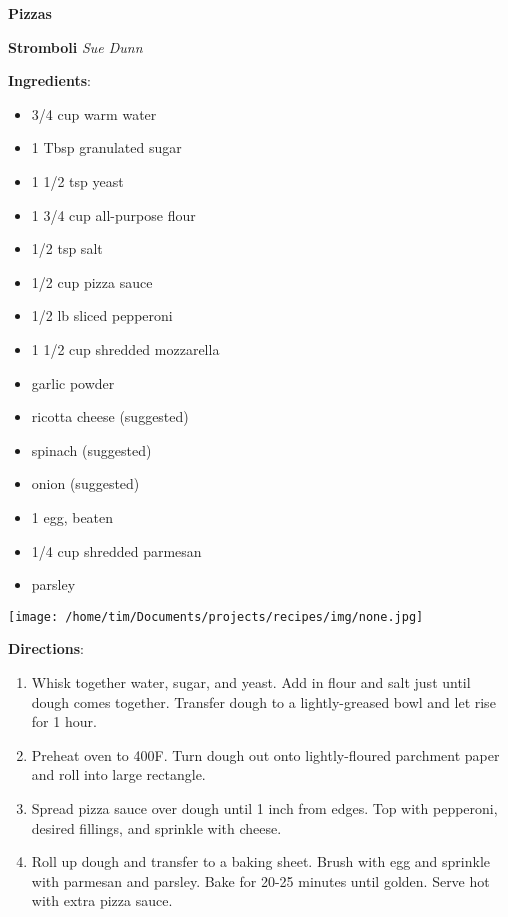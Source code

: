 \documentclass[11pt, twoside, openany]{book}
\begin{document}
{\newpage \LARGE \textbf{Pizzas}} \label{pizzas}\vspace{4mm}\\
\noindent\begin{minipage}[t]{\linewidth}%
{\Large\textbf{Stromboli}} \label{stromboli}\hfill\textit{Sue Dunn}\\
\noindent\begin{minipage}[t]{0.78\linewidth}%
\textbf{Ingredients}:\vspace{-3mm}
\begin{multicols}{2}
\begin{itemize}\setlength\itemsep{-1mm}
\item 3/4 cup warm water
\item 1 Tbsp granulated sugar
\item 1 1/2 tsp yeast
\item 1 3/4 cup all-purpose flour
\item 1/2 tsp salt
\item 1/2 cup pizza sauce
\item 1/2 lb sliced pepperoni
\item 1 1/2 cup shredded mozzarella
\item garlic powder
\item ricotta cheese (suggested)
\item spinach (suggested)
\item onion (suggested)
\item 1 egg, beaten
\item 1/4 cup shredded parmesan
\item parsley
\end{itemize}
\end{multicols}
\end{minipage}
\noindent\begin{minipage}[t]{0.18\linewidth}
\centering \strut\vspace*{-\baselineskip}\newline
\texttt{[image: /home/tim/Documents/projects/recipes/img/none.jpg]}\\
\end{minipage}\vspace{3mm}
\textbf{Directions}:
\vspace{-3mm}\begin{enumerate}\setlength\itemsep{-1mm}
\item Whisk together water, sugar, and yeast. Add in flour and salt just until dough comes together. Transfer dough to a lightly-greased bowl and let rise for 1 hour.
\item Preheat oven to 400F. Turn dough out onto lightly-floured parchment paper and roll into large rectangle.
\item Spread pizza sauce over dough until 1 inch from edges. Top with pepperoni, desired fillings, and sprinkle with cheese.
\item Roll up dough and transfer to a baking sheet. Brush with egg and sprinkle with parmesan and parsley. Bake for 20-25 minutes until golden. Serve hot with extra pizza sauce.
\end{enumerate}
\end{minipage}\vspace{8mm}
\end{document}
